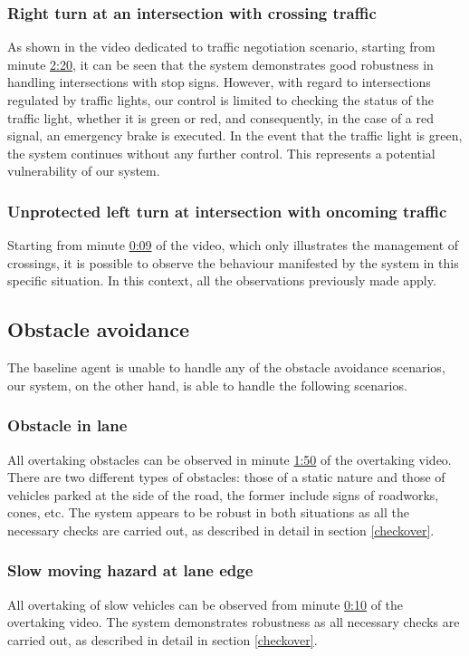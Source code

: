 \documentclass{article}
\begin{document}
\subsubsection{Right turn at an intersection with crossing traffic}
As shown in the video dedicated to traffic negotiation scenario, starting from minute \href{https://youtu.be/d2ESc0bXmmg?t=140}{2:20}, it can be seen that the system demonstrates good robustness in handling intersections with stop signs. However,
with regard to intersections regulated by traffic lights, our control is limited to checking the status of the traffic light, whether it is green or red, and
consequently, in the case of a red signal, an emergency brake is executed. In the event that the traffic light is green, the system continues without any
further control. This represents a potential vulnerability of our system.
\subsubsection{Unprotected left turn at intersection with oncoming traffic}
Starting from minute \href{https://youtu.be/d2ESc0bXmmg?t=9}{0:09} of the video, which only illustrates the management of crossings, it is possible to observe the behaviour manifested by the system in
this specific situation. In this context, all the observations previously made apply.

\subsection{Obstacle avoidance}
The baseline agent is unable to handle any of the obstacle avoidance scenarios, our system, on the other hand, is able to handle the following scenarios.
\subsubsection{Obstacle in lane}
All overtaking obstacles can be observed in minute \href{https://youtu.be/vDg-9poUQ9k?t=110}{1:50} of the overtaking video. There are two different types of obstacles: those of a static nature and
those of vehicles parked at the side of the road, the former include signs of roadworks, cones, etc. The system appears to be robust in both situations
as all the necessary checks are carried out, as described in detail in section \ref{checkover}.
\subsubsection{Slow moving hazard at lane edge}
All overtaking of slow vehicles can be observed from minute \href{https://youtu.be/vDg-9poUQ9k?t=10}{0:10} of the overtaking video. The system demonstrates robustness as all necessary checks are
carried out, as described in detail in section \ref{checkover}.
\end{document}
